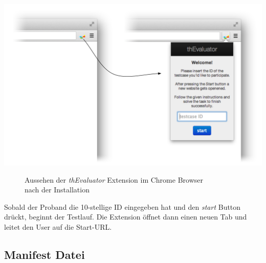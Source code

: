 \begin{center}
\includegraphics[scale=0.55]{./images/extension}
\end{center}
\begin{figure}[htb]
   \centering
   \caption{Aussehen der \textit{thEvaluator} Extension im Chrome Browser\\nach der Installation}
    \label{extension}
\end{figure}

Sobald der Proband die 10-stellige ID eingegeben hat und den \textit{start} Button drückt, beginnt der Testlauf. Die Extension öffnet dann einen neuen Tab und leitet den User auf die Start-URL.

\subsection{Manifest Datei}


